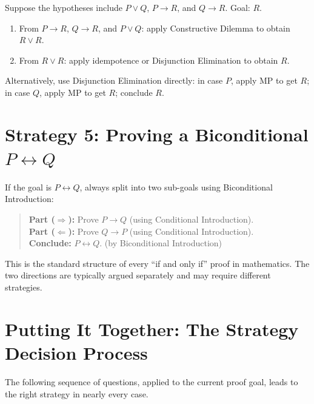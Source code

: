 \begin{example}
Suppose the hypotheses include $P \vee Q$, $P \to R$, and $Q \to R$.
Goal: $R$.

\begin{enumerate}
\item From $P \to R$, $Q \to R$, and $P \vee Q$: apply Constructive Dilemma
  to obtain $R \vee R$.
\item From $R \vee R$: apply idempotence or Disjunction Elimination to obtain $R$.
\end{enumerate}

Alternatively, use Disjunction Elimination directly: in case $P$, apply MP to
get $R$; in case $Q$, apply MP to get $R$; conclude $R$.
\end{example}


\section*{Strategy 5: Proving a Biconditional $P \leftrightarrow Q$}

If the goal is $P \leftrightarrow Q$, always split into two sub-goals using
Biconditional Introduction:

\begin{quote}
\textbf{Part ($\Rightarrow$):} Prove $P \to Q$ (using Conditional Introduction).\\
\textbf{Part ($\Leftarrow$):} Prove $Q \to P$ (using Conditional Introduction).\\
\textbf{Conclude:} $P \leftrightarrow Q$. \quad (by Biconditional Introduction)
\end{quote}

This is the standard structure of every ``if and only if'' proof in mathematics.
The two directions are typically argued separately and may require different
strategies.


\section*{Putting It Together: The Strategy Decision Process}

The following sequence of questions, applied to the current proof goal, leads
to the right strategy in nearly every case.

